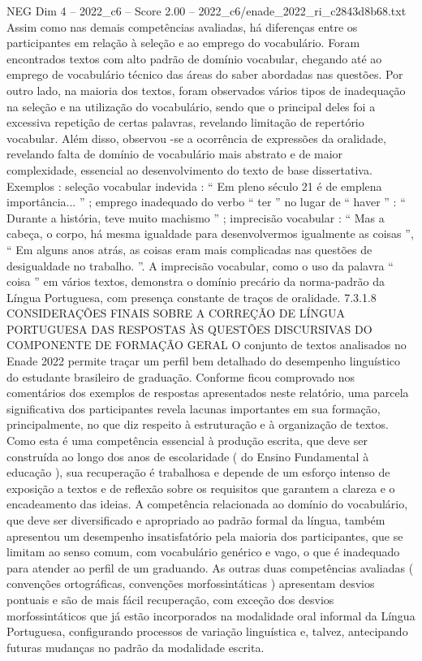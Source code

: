 \begin{textsample}{NEG Dim 4 – 2022\_c6 – Score 2.00 – 2022\_c6/enade\_2022\_ri\_c2843d8b68.txt}
Assim como nas demais competências avaliadas, há diferenças entre os participantes em relação à seleção e ao emprego do vocabulário.
Foram encontrados textos com alto padrão de domínio vocabular, chegando até ao emprego de vocabulário técnico das áreas do saber abordadas nas questões.
Por outro lado, na maioria dos textos, foram observados vários tipos de inadequação na seleção e na utilização do vocabulário, sendo que o principal deles foi a excessiva repetição de certas palavras, revelando limitação de repertório vocabular.
Além disso, observou -se a ocorrência de expressões da oralidade, revelando falta de domínio de vocabulário mais abstrato e de maior complexidade, essencial ao desenvolvimento do texto de base dissertativa.
Exemplos : seleção vocabular indevida : “ Em pleno século 21 é de emplena importância... ” ; emprego inadequado do verbo “ ter ” no lugar de “ haver ” : “ Durante a história, teve muito machismo ” ; imprecisão vocabular : “ Mas a cabeça, o corpo, há mesma igualdade para desenvolvermos igualmente as coisas ”, “ Em alguns anos atrás, as coisas eram mais complicadas nas questões de desigualdade no trabalho. ”.
A imprecisão vocabular, como o uso da palavra “ coisa ” em vários textos, demonstra o domínio precário da norma-padrão da Língua Portuguesa, com presença constante de traços de oralidade. 7.3.1.8 CONSIDERAÇÕES FINAIS SOBRE A CORREÇÃO DE LÍNGUA PORTUGUESA DAS RESPOSTAS ÀS QUESTÕES DISCURSIVAS DO COMPONENTE DE FORMAÇÃO GERAL O conjunto de textos analisados no Enade 2022 permite traçar um perfil bem detalhado do desempenho linguístico do estudante brasileiro de graduação.
Conforme ficou comprovado nos comentários dos exemplos de respostas apresentados neste relatório, uma parcela significativa dos participantes revela lacunas importantes em sua formação, principalmente, no que diz respeito à estruturação e à organização de textos.
Como esta é uma competência essencial à produção escrita, que deve ser construída ao longo dos anos de escolaridade ( do Ensino Fundamental à educação ), sua recuperação é trabalhosa e depende de um esforço intenso de exposição a textos e de reflexão sobre os requisitos que garantem a clareza e o encadeamento das ideias.
A competência relacionada ao domínio do vocabulário, que deve ser diversificado e apropriado ao padrão formal da língua, também apresentou um desempenho insatisfatório pela maioria dos participantes, que se limitam ao senso comum, com vocabulário genérico e vago, o que é inadequado para atender ao perfil de um graduando.
As outras duas competências avaliadas ( convenções ortográficas, convenções morfossintáticas ) apresentam desvios pontuais e são de mais fácil recuperação, com exceção dos desvios morfossintáticos que já estão incorporados na modalidade oral informal da Língua Portuguesa, configurando processos de variação linguística e, talvez, antecipando futuras mudanças no padrão da modalidade escrita.

\end{textsample}
